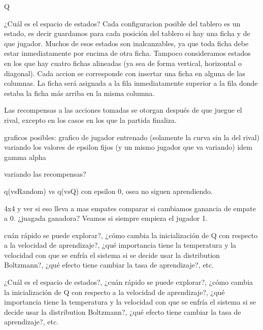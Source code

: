 \documentclass[10pt, a4paper]{article}
\begin{document}
Q

¿Cuál es el espacio de estados?
Cada configuracion posible del tablero es un estado, es decir guardamos para cada posición del tablero si hay una ficha y de que jugador. Muchos de esos estados son inalcanzables, ya que toda ficha debe estar inmediatamente por encima de otra ficha. Tampoco consideramos estados en los que hay cuatro fichas alineadas (ya sea de forma vertical, horizontal o diagonal). 
Cada accion se corresponde con insertar una ficha en alguna de las columnas. La ficha será asignada a la fila inmediatamente superior a la fila donde estaba la ficha más arriba en la misma columna.

Las recompensas a las acciones tomadas se otorgan después de que juegue el rival, excepto en los casos en los que la partida finaliza.

graficos posibles:
grafico de jugador entrenado (solamente la curva sin la del rival) variando los valores de epsilon fijos (y un mismo jugador que va variando)
idem gamma
alpha

variando las recompensas?

q(vsRandom) vs q(vsQ) con epsilon 0, osea no siguen aprendiendo.


4x4 y ver si eso lleva a  mas empates
comparar si cambiamos ganancia de empate a 0.
¿juagada ganadora? Veamos si siempre empieza el jugador 1.


cuán rápido se puede explorar?, ¿cómo cambia la inicialización de Q con respecto a la velocidad de aprendizaje?, ¿qué importancia tiene la temperatura y la velocidad con que se enfría el sistema si se decide usar la distribution Boltzmann?, ¿qué efecto tiene cambiar la tasa de aprendizaje?, etc.


¿Cuál es el espacio de estados?, ¿cuán rápido se puede explorar?, ¿cómo cambia la inicialización de Q con respecto a la velocidad de aprendizaje?, ¿qué importancia tiene la temperatura y la velocidad con que se enfría el sistema si se decide usar la distribution Boltzmann?, ¿qué efecto tiene cambiar la tasa de aprendizaje?, etc.
\end{document}
